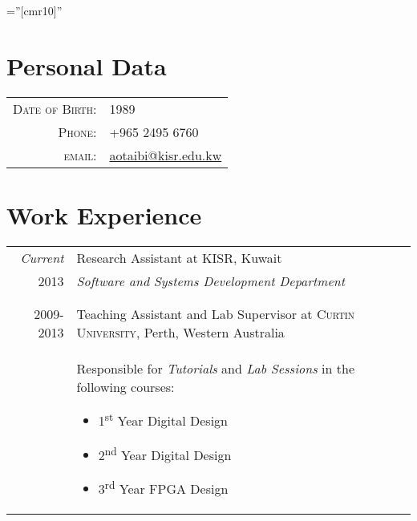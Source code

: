 \documentclass[a4paper,10pt]{article} %
\begin{document}
\pagestyle{empty} %

\font\fb=''[cmr10]'' %


\par{ %

\section{Personal Data}

\begin{tabular}{rl}
	\textsc{Date of Birth:} &1989 \\
	\textsc{Phone:} & +965 2495 6760\\
	\textsc{email:} & \href{mailto:aotaibi@kisr.edu.kw}{aotaibi@kisr.edu.kw}
\end{tabular}


\section{Work Experience}

\begin{tabular}{r|p{11cm}}
\emph{Current} & Research Assistant at \textsc{KISR}, Kuwait \\
\textsc{2013} & \emph{Software and Systems Development Department}\\ 
& \footnotesize{}\\
\multicolumn{2}{c}{} \\

\textsc{2009-2013} & Teaching Assistant and Lab Supervisor at \textsc{Curtin University}, Perth, Western Australia\emph{}\\
& \footnotesize{Responsible for \textit{Tutorials} and \textit{Lab Sessions} in the following courses:
			\begin{itemize}
				\item{1\textsuperscript{st} Year Digital Design}
				\item{2\textsuperscript{nd} Year Digital Design}
				\item{3\textsuperscript{rd} Year FPGA Design}
			\end{itemize}
			}
\end{tabular}

}
\end{document}
